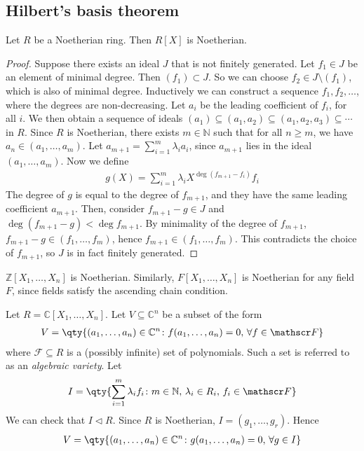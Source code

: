 \subsection{Hilbert's basis theorem}
\begin{theorem}
	Let $R$ be a Noetherian ring.
	Then $R[X]$ is Noetherian.
\end{theorem}
\begin{proof}
	Suppose there exists an ideal $J$ that is not finitely generated.
	Let $f_1 \in J$ be an element of minimal degree.
	Then $(f_1) \subset J$.
	So we can choose $f_2 \in J \setminus (f_1)$, which is also of minimal degree.
	Inductively we can construct a sequence $f_1, f_2, \dots$, where the degrees are non-decreasing.
	Let $a_i$ be the leading coefficient of $f_i$, for all $i$.
	We then obtain a sequence of ideals $(a_1) \subseteq (a_1, a_2) \subseteq (a_1, a_2, a_3) \subseteq \cdots$ in $R$.
	Since $R$ is Noetherian, there exists $m \in \mathbb N$ such that for all $n \geq m$, we have $a_{n} \in (a_1, \dots, a_m)$.
	Let $a_{m+1} = \sum_{i=1}^m \lambda_i a_i$, since $a_{m+1}$ lies in the ideal $(a_1, \dots, a_m)$.
	Now we define
	\begin{align*}
		g(X) = \sum_{i=1}^m \lambda_i X^{\deg (f_{m+1} - f_i)} f_i
	\end{align*}
	The degree of $g$ is equal to the degree of $f_{m+1}$, and they have the same leading coefficient $a_{m+1}$.
	Then, consider $f_{m+1} - g \in J$ and $\deg (f_{m+1} - g) < \deg f_{m+1}$.
	By minimality of the degree of $f_{m+1}$, $f_{m+1} - g \in (f_1, \dots, f_m)$, hence $f_{m+1} \in (f_1, \dots, f_m)$.
	This contradicts the choice of $f_{m+1}$, so $J$ is in fact finitely generated.
\end{proof}
\begin{corollary}
	$\mathbb Z[X_1, \dots, X_n]$ is Noetherian.
	Similarly, $F[X_1, \dots, X_n]$ is Noetherian for any field $F$, since fields satisfy the ascending chain condition.
\end{corollary}
\begin{example}
	Let $R = \mathbb C[X_1, \dots, X_n]$.
	Let $V \subseteq \mathbb C^n$ be a subset of the form
	\begin{align*}
		V = \qty{(a_1, \dots, a_n) \in \mathbb C^n \colon f(a_1, \dots, a_n) = 0,\,\forall f \in \mathscr F}
	\end{align*}
	where $\mathscr F \subseteq R$ is a (possibly infinite) set of polynomials.
	Such a set is referred to as an \textit{algebraic variety}.
	Let
	\begin{align*}
		I = \qty{\sum_{i=1}^m \lambda_i f_i \colon m \in \mathbb N,\, \lambda_i \in R_i,\, f_i \in \mathscr F}
	\end{align*}
	We can check that $I \triangleleft R$.
	Since $R$ is Noetherian, $I = (g_1, \dots, g_r)$.
	Hence
	\begin{align*}
		V = \qty{(a_1, \dots, a_n) \in \mathbb C^n \colon g(a_1, \dots, a_n) = 0,\,\forall g \in I}
	\end{align*}
\end{example}
